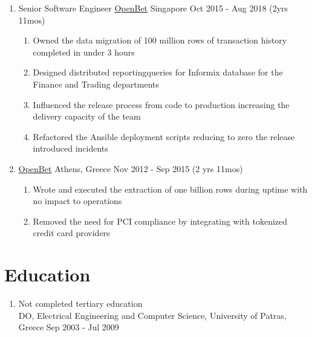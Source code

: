 \documentclass{CVSoftwareEngineer}
\begin{document}
\begin{enumerate}[labelwidth=!, labelindent=0pt, leftmargin=*, rightmargin=15pt]
		\item[] \cvExperience
			{Senior Software Engineer}
			{\href{https://www.openbet.com/}{OpenBet}}
			{Singapore}
			{Oct 2015 - Aug 2018 (2yrs 11mos)}
			{
				\begin{enumerate}[labelwidth=!, labelindent=0pt, nosep, leftmargin=*]
					\item[\textasteriskcentered] Owned the data migration of 100 million rows of
						transaction history completed in under 3 hours
					\item[\textasteriskcentered] Designed distributed reportingqueries for Informix
						database for the Finance and Trading departments
					\item[\textasteriskcentered] Influenced the release process from code to
						production increasing the delivery capacity of the team
					\item[\textasteriskcentered] Refactored the Ansible deployment scripts
						reducing to zero the release introduced incidents
				\end{enumerate}
			}

		\item[]  
			{\href{https://www.openbet.com/}{OpenBet}}
			{Athens, Greece}
			{Nov 2012 - Sep 2015 (2 yrs 11mos)}
			{
				\begin{enumerate}[labelwidth=!, labelindent=0pt, nosep, leftmargin=*]
					\item[\textasteriskcentered] Wrote and executed the extraction of
						one billion rows during uptime with no impact to operations
					\item[\textasteriskcentered] Removed the need for PCI compliance by
						integrating with tokenized credit card providers
				\end{enumerate}
			}
	\end{enumerate}

	\section{Education}
	\begin{enumerate}[labelwidth=!, labelindent=0pt, leftmargin=*, rightmargin=15pt]
		\item[] Not completed tertiary education \\
			DO, Electrical Engineering and Computer Science, University of Patras, Greece \hfill {\scriptsize Sep 2003 - Jul 2009}
	\end{enumerate}
\end{document}
